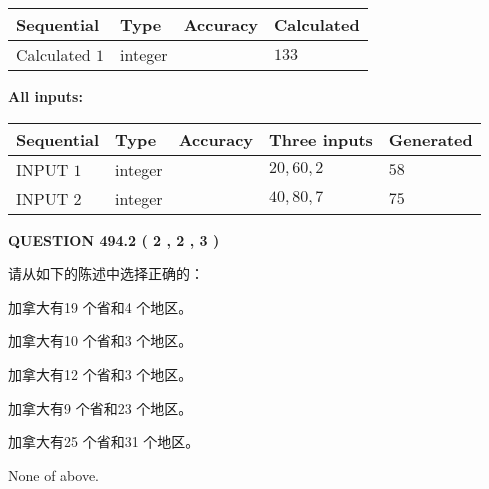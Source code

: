 \documentclass{ctexart}
\begin{document}
   
   
   
\noindent{}
   
   
  
  
\noindent\begin{tabular}{|l|l|l|l|}
\hline
 Sequential & Type & Accuracy & Calculated \\ 
\hline
 
 
  Calculated $  1 $ & integer &  & 
  $ 133 $ 
 \\  \hline  
 \end{tabular}
   
   
   
   
\noindent\vspace{0.1in}\hspace{-0.08in} {\textbf{\Large{All inputs: }}}
   
   
  
  
\noindent\begin{tabular}{|l|l|l|l|l|}
\hline
 Sequential & Type & Accuracy & Three inputs & Generated \\ 
\hline
 
 
  INPUT $  1 $ & integer &  & $
 20
 , 
 60
 , 
 2
 $ & $ 58 $ 
 \\  \hline  
 
 
  INPUT $  2 $ & integer &  & $
 40
 , 
 80
 , 
 7
 $ & $ 75 $ 
 \\  \hline  
 \end{tabular}
   
   
  
\vspace{0.2in}
  
{\textbf{\Large{QUESTION
494.2 
 ( 2 , 2 , 3 )
}}}
  
  
请从如下的陈述中选择正确的：
 
 
加拿大有19 个省和4 个地区。
 
 
加拿大有10 个省和3 个地区。
 
 
加拿大有12 个省和3 个地区。
 
 
加拿大有9 个省和23 个地区。
 
 
加拿大有25 个省和31 个地区。
 
 
 None of above.
 
 
\noindent{}
 
\end{document}
